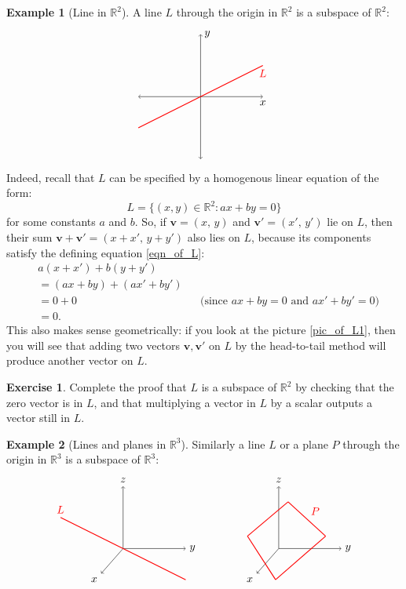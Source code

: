 \documentclass[a4paper,11pt]{book}
\theoremstyle{definition}
\newtheorem{exercise}{Exercise}
\newtheorem{example_environment}{Example}[chapter]
\newcommand{\be}{\begin{equation}}
\newcommand{\ee}{\end{equation}}
\newcommand{\ba}{\begin{aligned}}
\newcommand{\ea}{\end{aligned}}
\newcommand{\ve}[1]{\mathbf{#1}}
\newenvironment{example}
	{
		\begin{oframed} 
		\begin{example_environment}
	}
	{
		\end{example_environment}
		\end{oframed}
	}
\begin{document}
\begin{example}[Line in $\mathbb{R}^2$] A line $L$ through the origin in $\mathbb{R}^2$ is a subspace of $\mathbb{R}^2$:
\be \label{pic_of_L1}
\ba
\begin{tikzpicture}
	\draw[<->] (-2, 0) -- (2,0) node[below] {$x$};
	\draw[<->] (0, -2) -- (0, 2) node[right] {$y$};
	\draw[thick, red] (-2, -1) -- (2, 1) node[below] {$L$};
\end{tikzpicture}
\ea
\ee
Indeed, recall that $L$ can be specified by a homogenous linear equation of the form:
\be \label{eqn_of_L}
 L = \{ (x,y) \in \mathbb{R}^2 : ax + by = 0 \}
\ee
for some constants $a$ and $b$. So, if $\ve{v} = (x, \, y)$ and $\ve{v}' = (x', \, y')$ lie on $L$, then their sum $\ve{v} + \ve{v}' = (x + x', \, y + y')$ also lies on $L$, because its components satisfy the defining equation \eqref{eqn_of_L}:
\begin{align*}
 &a(x + x') + b (y + y')\\
 & = (ax + by) + (ax' + by') \\
 &= 0 + 0 && \mbox{(since $ax + by = 0$ and $ax' + by' = 0$)} \\
 &= 0.
\end{align*}
This also makes sense geometrically: if you look at the picture \eqref{pic_of_L1}, then you will see that adding two vectors $\ve{v}, \ve{v}'$ on $L$ by the head-to-tail method will produce another vector on $L$.  
\begin{exercise} Complete the proof that $L$ is a subspace of $\mathbb{R}^2$ by checking that the zero vector is in $L$, and that multiplying a vector in $L$ by a scalar outputs a vector still in $L$.
\end{exercise}
\end{example}

\begin{example}[Lines and planes in $\mathbb{R}^3$] Similarly a line $L$ or a plane $P$ through the origin in $\mathbb{R}^3$ is a subspace of $\mathbb{R}^3$:
\be \label{pic_of_L}
\ba
\begin{tikzpicture}
 	\draw[->] (0, 0) -- (2,0) node[right] {$y$};
	\draw[->] (0, 0) -- (0, 2) node[above] {$z$};
	\draw[->] (0,0) -- (-0.7, -0.8) node[below left] {$x$};
	\draw[thick, red] (-2, 1) node[above] {$L$} -- (2, -1);
\end{tikzpicture}
\ea
\qquad \qquad
\ba
\begin{tikzpicture}
 	\draw[->] (0, 0) -- (2,0) node[right] {$y$};
	\draw[->] (0, 0) -- (0, 2) node[above] {$z$};
	\draw[->] (0,0) -- (-0.7, -0.8) node[below left] {$x$};
	\draw[thick, red] (-0.1, -1) -- (-1, 0.4);
	\draw[thick, red] (-1, 0.4) -- (0.3, 1.5);
	\draw[thick, red] (0.3, 1.5) -- node[above right] {$P$} (1.5, 0.4);
	\draw[thick, red] (1.5, 0.4) -- (-0.1, -1);
\end{tikzpicture}
\ea
\ee

\end{example}
\end{document}
